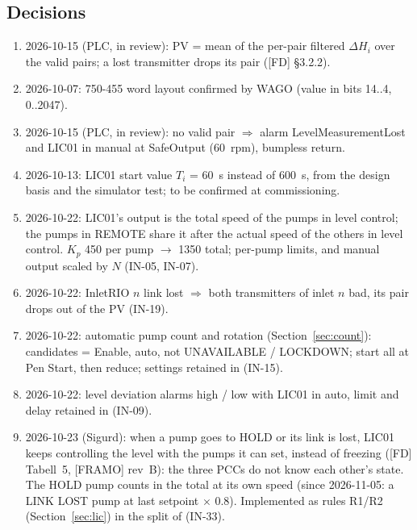 \documentclass[11pt,a4paper]{article}
\begin{document}
\subsection{Decisions}
\begin{small}
\begin{enumerate}[label=\textbf{DEC\arabic*}, leftmargin=12mm, itemsep=0.5mm]
  \item 2026-10-15 (PLC, in review): PV = mean of the per-pair filtered $\Delta H_i$ over the valid pairs;
        a lost transmitter drops its pair ([FD] \S3.2.2).
  \item 2026-10-07: 750-455 word layout confirmed by WAGO (value in bits 14..4, 0..2047).
  \item 2026-10-15 (PLC, in review): no valid pair $\Rightarrow$ alarm LevelMeasurementLost and LIC01 in
        manual at SafeOutput (60~rpm), bumpless return.
  \item 2026-10-13: LIC01 start value $T_i$ = 60~s instead of 600~s, from the design basis and the
        simulator test; to be confirmed at commissioning.
  \item 2026-10-22: LIC01's output is the total speed of the pumps in level control; the pumps in REMOTE
        share it after the actual speed of the others in level control. $K_p$ 450 per pump $\to$ 1350
        total; per-pump limits,  and manual output scaled by $N$ (IN-05, IN-07).
  \item 2026-10-22: InletRIO $n$ link lost $\Rightarrow$ both transmitters of inlet $n$ bad, its pair
        drops out of the PV (IN-19).
  \item 2026-10-22: automatic pump count and rotation (Section~\ref{sec:count}): candidates = Enable, auto,
        not UNAVAILABLE / LOCKDOWN; start all at Pen Start, then reduce; settings retained in
         (IN-15).
  \item 2026-10-22: level deviation alarms high / low with LIC01 in auto, limit and delay retained in
         (IN-09).
  \item 2026-10-23 (Sigurd): when a pump goes to HOLD or its link is lost, LIC01 keeps controlling the level
        with the pumps it can set, instead of freezing ([FD] Tabell~5, [FRAMO] rev~B): the three PCCs do not
        know each other's state. The HOLD pump counts in the total at its own speed (since 2026-11-05: a
        LINK LOST pump at last setpoint $\times$ 0.8). Implemented as rules
        R1/R2 (Section~\ref{sec:lic}) in the split of  (IN-33).
\end{enumerate}
\end{small}
\end{document}
